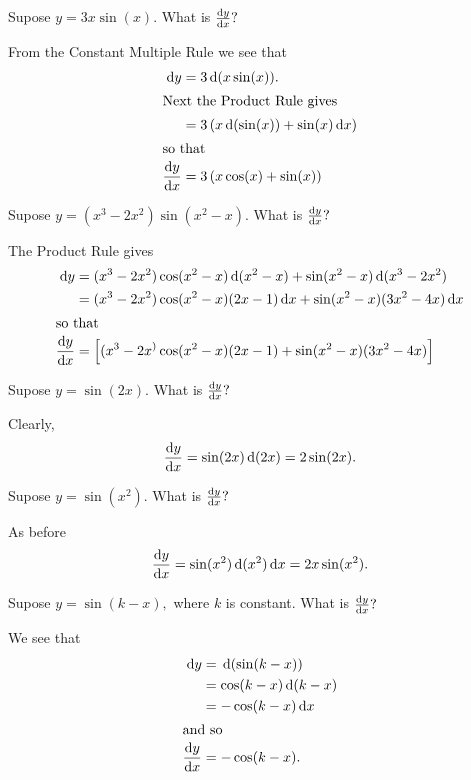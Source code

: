 \begin{myexample}{}
  Supose $y=3x\sin(x).$ What is $\frac{\text{d}{y}}{\text{d}{x}}?$

From the Constant Multiple Rule we see that 
\begin{align*}
\thinspace{\rm d}y &= 3\thinspace{\rm d}(x\sin(x)).\\
\intertext{Next the Product Rule gives}
&=3\left(x\thinspace{\rm d}(\sin(x)) + \sin(x)\thinspace{\rm d}x\right)\\
\intertext{so that}
\frac{\text{d}{y}}{\text{d}{x}} &=3\left(x\cos(x) + \sin(x)\right)
\end{align*}
\end{myexample}

\begin{myexample}{}
  Supose $y=(x^3-2x^2)\sin(x^2-x).$ What is $\frac{\text{d}{y}}{\text{d}{x}}?$

The Product Rule gives
\begin{align*}
  \thinspace{\rm d}y &= (x^3-2x^2)\cos(x^2-x)\thinspace{\rm d}(x^2-x) + \sin(x^2-x)\thinspace{\rm d}(x^3-2x^2) \\
       &= (x^3-2x^2)\cos(x^2-x)(2x-1)\thinspace{\rm d}x + \sin(x^2-x)(3x^2-4x)\thinspace{\rm d}x \\
\intertext{so that}
  \frac{\text{d}{y}}{\text{d}{x}} &= \left[(x^3-2x^)\cos(x^2-x)(2x-1) + \sin(x^2-x)(3x^2-4x)\right]
\end{align*}
\end{myexample}

\begin{myexample}{}
  Supose $y=\sin(2x).$ What is $\frac{\text{d}{y}}{\text{d}{x}}?$

Clearly, 
\[
  \frac{\text{d}{y}}{\text{d}{x}} = \sin(2x)\thinspace{\rm d}(2x) = 2\sin(2x).
\]
\end{myexample}

\begin{myexample}{}
  Supose $y=\sin(x^2).$ What is $\frac{\text{d}{y}}{\text{d}{x}}?$

As before 
\[
\frac{\text{d}{y}}{\text{d}{x}} = \sin(x^2)\thinspace{\rm d}(x^2)\thinspace{\rm d}x = 2x\sin(x^2).
\]
\end{myexample}


\begin{myexample}{}
  Supose $y=\sin(k-x),$ where $k$ is constant. What is $\frac{\text{d}{y}}{\text{d}{x}}?$

We see that
\begin{align*}
  \thinspace{\rm d}y &= \thinspace{\rm d}(\sin(k-x))\\
  &= \cos(k-x)\thinspace{\rm d}(k-x)\\
  &= -\cos(k-x)\thinspace{\rm d}x\\
\intertext{and so}
  \frac{\text{d}{y}}{\text{d}{x}} &=-\cos(k-x).\\
\end{align*}
\end{myexample}

